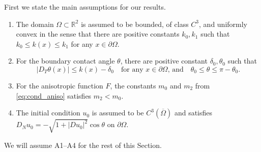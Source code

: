 \documentclass[12pt]{article}
\numberwithin{equation}{section}
\theoremstyle{plain}
\theoremstyle{definition}
\theoremstyle{remark}
\begin{document}
First we state the main assumptions for our results.

\begin{enumerate}
\item[A1.] The domain $\Omega\subset\mathbb{R}^2$ is assumed to be bounded, of class
$C^3$, and uniformly convex in the sense that there are positive constants $k_0, k_1$
such that $k_0 \leq k(x) \leq k_1$ for any $x\in\partial\Omega$.

\item[A2.] For the boundary contact angle $\theta$, there are positive constant 
$\delta_0, \theta_0$ such that 
\[
|D_T\theta(x)|\leq k(x) -\delta_0\quad\text{for any $x\in\partial\Omega$, and}\quad
\theta_0 \leq \theta \leq \pi- \theta_0.
\]
\item[A3.] For the anisotropic function $F$, the constants $m_0$ and $m_2$
from \eqref{eq:cond_aniso} satisfies $m_2 < m_0$.

\item[A4.] The initial condition $u_0$ is assumed to be $C^3(\overline{\Omega})$ and satisfies $D_N u_0 = - \sqrt{1+|Du_0|^2} \cos \theta$ on $\partial \Omega$.
\end{enumerate}
We will assume A1--A4 for the rest of this Section.
\end{document}
